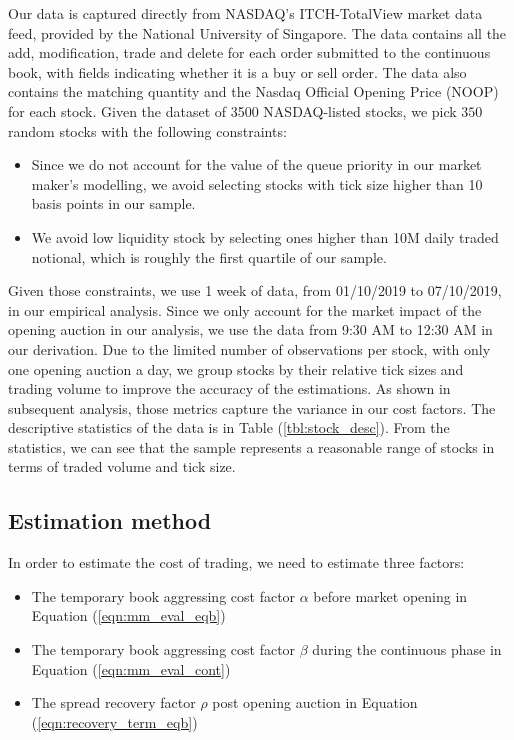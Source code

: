 \documentclass{article}
\newcommand{\numberOfStocks}{350}
\begin{document}
Our data is captured directly from NASDAQ's ITCH-TotalView market data feed, provided by the National University of Singapore. The data contains all the add, modification, trade and delete for each order submitted to the continuous book, with fields indicating whether it is a buy or sell order. The data also contains the matching quantity and the Nasdaq Official Opening Price (NOOP) for each stock. Given the dataset of 3500 NASDAQ-listed stocks, we pick $\numberOfStocks$ random stocks with the following constraints:
\begin{itemize}
  \item Since we do not account for the value of the queue priority in our market maker's modelling, we avoid selecting stocks with tick size higher than 10 basis points in our sample.
  \item We avoid low liquidity stock by selecting ones higher than 10M daily traded notional, which is roughly the first quartile of our sample.
\end{itemize}

Given those constraints, we use 1 week of data, from 01/10/2019 to 07/10/2019, in our empirical analysis. Since we only account for the market impact of the opening auction in our analysis, we use the data from 9:30 AM to 12:30 AM in our derivation. Due to the limited number of observations per stock, with only one opening auction a day, we group stocks by their relative tick sizes and trading volume to improve the accuracy of the estimations. As shown in subsequent analysis, those metrics capture the variance in our cost factors. The descriptive statistics of the data is in Table (\ref{tbl:stock_desc}). From the statistics, we can see that the sample represents a reasonable range of stocks in terms of traded volume and tick size.



\subsection{Estimation method}
In order to estimate the cost of trading, we need to estimate three factors:

\begin{itemize}
  \item The temporary book aggressing cost factor $\alpha$ before market opening in Equation (\ref{eqn:mm_eval_eqb})
  \item The temporary book aggressing cost factor $\beta$ during the continuous phase in Equation (\ref{eqn:mm_eval_cont})
  \item The spread recovery factor $\rho$ post opening auction in Equation (\ref{eqn:recovery_term_eqb})
\end{itemize}
\end{document}
